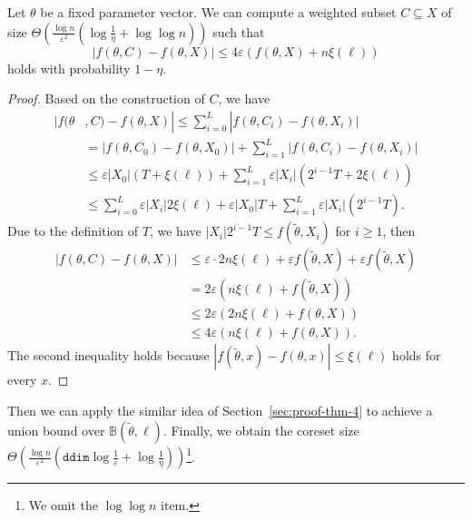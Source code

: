 \begin{lemma}\label{lemma-layer}
	Let $\theta$ be a fixed parameter vector. We can compute a weighted subset $ C\subseteq X $ of size $ \Theta\left(\frac{\log n}{\varepsilon^2}\left(\log\frac{1}{\eta}+\log\log n \right) \right) $ such that 
	\begin{equation}\label{fixed-parameter}
		|{f}(\theta,C)-{f}(\theta,X)|\leq 4\varepsilon({f}(\theta,X)+n\xi(\ell))
	\end{equation}
	holds  with probability $ 1-\eta $.
\end{lemma}
\begin{proof}
	Based on the construction of $ C $, we have
	\begin{align*}
		|f(\theta&,C)-f(\theta,X)|\leq 
		\sum_{i=0}^L|f(\theta,C_i)-f(\theta,X_i)| \\
		&=|f(\theta,C_0)-f(\theta,X_0)|+\sum_{i=1}^L|f(\theta,C_i)-f(\theta,X_i)| \\
		&\leq  \varepsilon |X_0|(T+\xi(\ell)) +\sum_{i=1}^L\varepsilon|X_i|(2^{i-1}T+2\xi(\ell))\\
		&\leq \sum_{i=0}^L\varepsilon|X_i|2\xi(\ell)+ \varepsilon |X_0|T+\sum_{i=1}^L\varepsilon|X_i|(2^{i-1}T).	
	\end{align*}	
	Due to the definition of $ T $, we have $ |X_i|2^{i-1}T \leq f(\tilde{\theta},X_i) $ for $ i\geq 1 $, then 
		\begin{align*}
		|{f}(\theta,C)-{f}(\theta,X)|& \leq \varepsilon\cdot 2n\xi(\ell)+\varepsilon {f}(\tilde{\theta},X)+\varepsilon {f}(\tilde{\theta},X)\\
		&=2\varepsilon(n\xi(\ell)+{f}(\tilde{\theta},X))\\
		&\leq 2\varepsilon(2n\xi(\ell)+{f}(\theta,X))\\
		&\leq 4\varepsilon(n\xi(\ell)+{f}(\theta,X)).
		\end{align*}
	The second inequality holds because $ |f(\tilde{\theta},x)-f(\theta,x)|\leq \xi(\ell) $ holds for every $ x $.
\end{proof}


Then we can apply the similar idea of Section~\ref{sec:proof-thm-4} to achieve a union bound over $ \mathbb{B}(\tilde{\theta},\ell) $. Finally, we obtain the coreset size 
$ \Theta\left(\frac{\log n}{\varepsilon^2}\left(\mathtt{ddim}\log\frac{1}{\varepsilon}+\log\frac{1}{\eta}\right) \right)$\footnote{We omit the $ \log\log n $ item.}.
